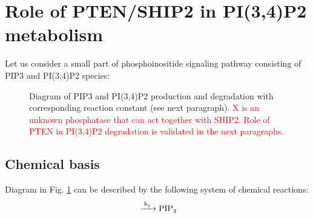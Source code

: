\documentclass[12pt]{article} %
\begin{document}
\newpage %


\section{Role of PTEN/SHIP2 in PI(3,4)P2 metabolism} %

Let us consider a small part of phosphoinositide signaling pathway consisting of PIP3 and PI(3,4)P2 species:

\begin{figure}[H] %
\caption{Diagram of PIP3 and PI(3,4)P2 production and degradation with corresponding reaction constant (see next paragraph). \textcolor{red}{X is an unknown phosphatase that can act together with SHIP2. Role of PTEN in PI(3,4)P2 degradation is validated in the next paragraphs.}}
\label{fig:diagram}
\end{figure}

\subsection{Chemical basis} %
Diagram in Fig. \ref{fig:diagram} can be described by the following system of chemical reactions:
\begin{equation}
 \ce{ ->[\ce{k_1}] PIP3}
 \label{eq:pip3_production}
\end{equation}
\end{document}
